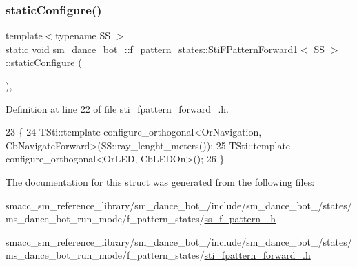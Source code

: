 \subsubsection{\texorpdfstring{static\+Configure()}{staticConfigure()}}
{\footnotesize\ttfamily template$<$typename SS $>$ \\
static void \hyperlink{classsm__dance__bot__2_1_1f__pattern__states_1_1StiFPatternForward1}{sm\+\_\+dance\+\_\+bot\+\_\+::f\+\_\+pattern\+\_\+states\+::\+Sti\+F\+Pattern\+Forward1}$<$ SS $>$\+::static\+Configure (\begin{DoxyParamCaption}{ }\end{DoxyParamCaption})\hspace{0.3cm}{\ttfamily [inline]}, {\ttfamily [static]}}



Definition at line 22 of file sti\+\_\+fpattern\+\_\+forward\+\_.\+h.


\begin{DoxyCode}
23   \{
24      TSti::template configure\_orthogonal<OrNavigation, CbNavigateForward>(SS::ray\_lenght\_meters());
25      TSti::template configure\_orthogonal<OrLED, CbLEDOn>();
26   \}
\end{DoxyCode}


The documentation for this struct was generated from the following files\+:\begin{DoxyCompactItemize}
\item 
smacc\+\_\+sm\+\_\+reference\+\_\+library/sm\+\_\+dance\+\_\+bot\+\_/include/sm\+\_\+dance\+\_\+bot\+\_/states/ms\+\_\+dance\+\_\+bot\+\_\+run\+\_\+mode/f\+\_\+pattern\+\_\+states/\hyperlink{2_2include_2sm__dance__bot__2_2states_2ms__dance__bot__run__mode_2f__pattern__states_2ss__f__pattern__1_8h}{ss\+\_\+f\+\_\+pattern\+\_.\+h}\item 
smacc\+\_\+sm\+\_\+reference\+\_\+library/sm\+\_\+dance\+\_\+bot\+\_/include/sm\+\_\+dance\+\_\+bot\+\_/states/ms\+\_\+dance\+\_\+bot\+\_\+run\+\_\+mode/f\+\_\+pattern\+\_\+states/\hyperlink{2_2include_2sm__dance__bot__2_2states_2ms__dance__bot__run__mode_2f__pattern__states_2sti__fpattern__forward__1_8h}{sti\+\_\+fpattern\+\_\+forward\+\_.\+h}\end{DoxyCompactItemize}
